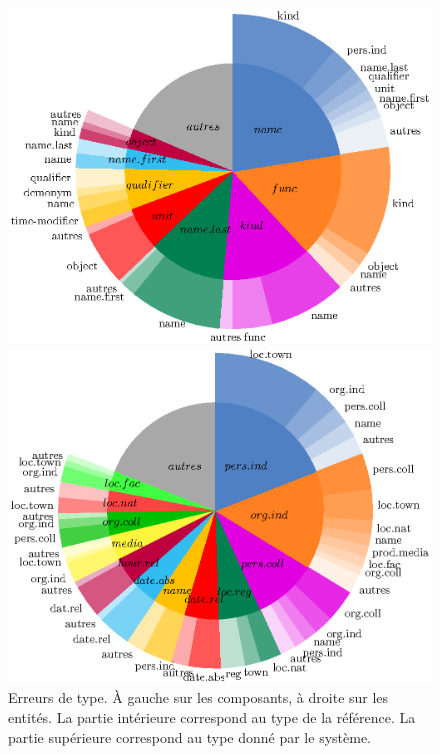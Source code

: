 \documentclass[12pt,a4paper,times,twoside,openright]{report}
\begin{document}
\begin{figure}
\begin{minipage}{0.49\linewidth}
    \centering
    \includegraphics[scale=0.6]{images/quaero/components-type}
\end{minipage}
\begin{minipage}{0.49\linewidth}
    \centering
    \includegraphics[scale=0.6]{images/quaero/entities-type}
\end{minipage}
\caption{Erreurs de type. À gauche sur les composants, à droite sur les entités. La partie intérieure correspond au type de la référence. La partie supérieure correspond au type donné par le système.}
\label{fig:type-errors-components}
\end{figure}
\end{document}

